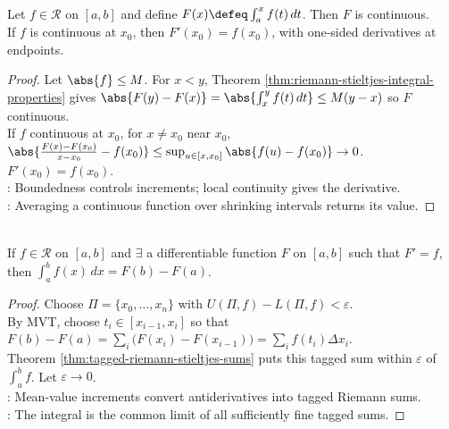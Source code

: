 \begin{theorem} \label{thm:integral-function-continuity-and-derivative} \\
Let $f\in\mathcal{R}$ on $[a,b]$ and define $F(x)\defeq\int_a^x f(t)\,dt$. Then $F$ is continuous.\\
If $f$ is continuous at $x_0$, then $F'(x_0)=f(x_0)$, with one-sided derivatives at endpoints.
\begin{proof}
Let $\abs{f}\leq M$. For $x<y$, Theorem \ref{thm:riemann-stieltjes-integral-properties} gives $\abs{F(y)-F(x)}=\abs{\int_x^y f(t)\,dt}\leq M(y-x)$ so $F$ continuous.\\
If $f$ continuous at $x_0$, for $x\neq x_0$ near $x_0$, $\abs{\frac{F(x)-F(x_0)}{x-x_0}-f(x_0)} \leq \sup_{u \in [x, x_0]}\abs{f(u)-f(x_0)}\to0$. $F'(x_0)=f(x_0)$.\\
: Boundedness controls increments; local continuity gives the derivative.\\
: Averaging a continuous function over shrinking intervals returns its value.
\end{proof}
\end{theorem}

\begin{theorem} \label{thm:fundamental-theorem-calculus-riemann} \\
If $f\in\mathcal{R}$ on $[a,b]$ and $\exists$ a differentiable function $F$ on $[a,b]$ such that $F'=f$, then $\int_a^b f(x)\,dx=F(b)-F(a)$.
\begin{proof}
Choose $\Pi=\{x_0,\ldots,x_n\}$ with $U(\Pi,f)-L(\Pi,f)<\varepsilon$.\\
By MVT, choose $t_i\in[x_{i-1},x_i]$ so that $F(b)-F(a)=\sum\limits_i\bigl(F(x_i)-F(x_{i-1})\bigr)=\sum\limits_i f(t_i)\Delta x_i$.\\
Theorem \ref{thm:tagged-riemann-stieltjes-sums} puts this tagged sum within $\varepsilon$ of $\int_a^b f$. Let $\varepsilon\to0$.\\
: Mean-value increments convert antiderivatives into tagged Riemann sums.\\
: The integral is the common limit of all sufficiently fine tagged sums.
\end{proof}
\end{theorem}

